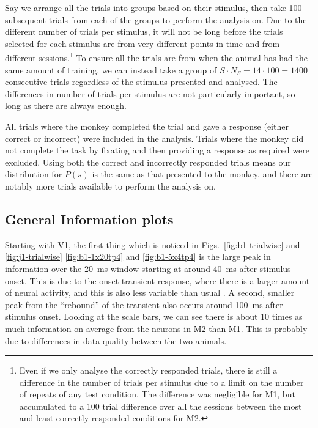 Say we arrange all the trials into groups based on their stimulus, then take 100 subsequent trials from each of the groups to perform the analysis on.
Due to the different number of trials per stimulus, it will not be long before the trials selected for each stimulus are from very different points in time and from different sessions.\footnote{Even if we only analyse the correctly responded trials, there is still a difference in the number of trials per stimulus due to a limit on the number of repeats of any test condition.
The difference was negligible for \ac{M1}, but accumulated to a 100 trial difference over all the sessions between the most and least correctly responded conditions for \ac{M2}.}
To ensure all the trials are from when the animal has had the same amount of training, we can instead take a group of $S \cdot N_S = 14 \cdot 100 = 1400$ consecutive trials regardless of the stimulus presented and analysed.
The differences in number of trials per stimulus are not particularly important, so long as there are always  enough.

All trials where the monkey completed the trial and gave a response (either correct or incorrect) were included in the analysis.
Trials where the monkey did not complete the task by fixating and then providing a response as required were excluded.
Using both the correct and incorrectly responded trials means our distribution for $P(s)$ is the same as that presented to the monkey, and there are notably more trials available to perform the analysis on.



\subsection{General Information plots}

Starting with \ac{V1}, the first thing which is noticed in Figs.~\ref{fig:b1-trialwise} and \ref{fig:j1-trialwise} \ref{fig:b1-1x20tp4} and \ref{fig:b1-5x4tp4} is the large peak in information over the \SI{20}{ms} window starting at around \SI{40}{ms} after stimulus onset.
This is due to the onset transient response, where there is a larger amount of neural activity, and this is also less variable than usual \citep{Muller2001}.
A second, smaller peak from the ``rebound'' of the transient also occurs around \SI{100}{ms} after stimulus onset.
Looking at the scale bars, we can see there is about 10 times as much information on average from the neurons in \ac{M2} than \ac{M1}.
This is probably due to differences in data quality between the two animals.

